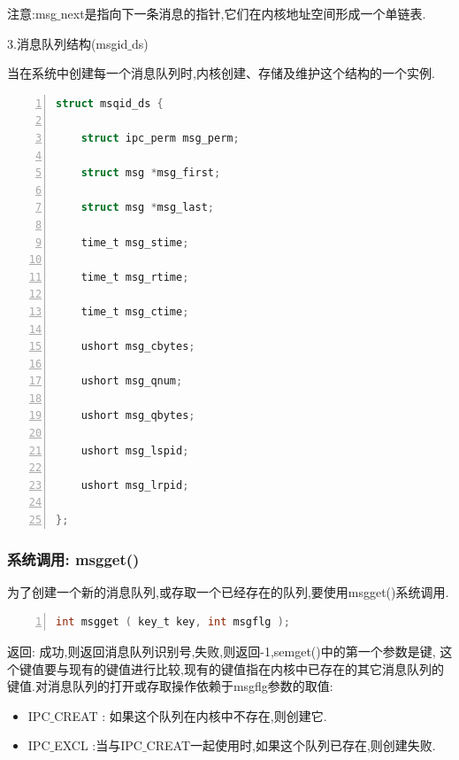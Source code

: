 \documentclass[a4paper,12pt,notitlepage]{article}
\begin{document}
	注意:msg$\_$next是指向下一条消息的指针,它们在内核地址空间形成一个单链表.

3.消息队列结构(msgid$\_$ds)

	当在系统中创建每一个消息队列时,内核创建、存储及维护这个结构的一个实例.

\begin{lstlisting}[frame=shadowbox,numbers=left,language=C]
struct msqid_ds {

    struct ipc_perm msg_perm;

    struct msg *msg_first;  

    struct msg *msg_last;    

    time_t msg_stime;        
    
    time_t msg_rtime;         

    time_t msg_ctime; 

    ushort msg_cbytes;  

    ushort msg_qnum;  

    ushort msg_qbytes;   

    ushort msg_lspid; 

    ushort msg_lrpid;  

};
\end{lstlisting}

\subsubsection{系统调用: msgget()}

	为了创建一个新的消息队列,或存取一个已经存在的队列,要使用msgget()系统调用.  
	                                 
\begin{lstlisting}[frame=shadowbox,numbers=left,language=C]
int msgget ( key_t key, int msgflg );                                            
\end{lstlisting}

	返回: 成功,则返回消息队列识别号,失败,则返回-1,semget()中的第一个参数是键, 这个键值要与现有的键值进行比较,现有的键值指在内核中已存在的其它消息队列的键值.对消息队列的打开或存取操作依赖于msgflg参数的取值: \\

\begin{itemize}
	\item IPC$\_$CREAT : 如果这个队列在内核中不存在,则创建它.
	\item IPC$\_$EXCL :当与IPC$\_$CREAT一起使用时,如果这个队列已存在,则创建失败.
\end{itemize}
\end{document}
